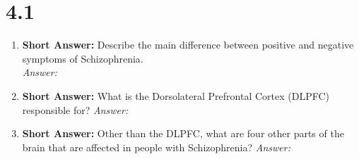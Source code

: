 \section*{4.1}
\begin{enumerate}[label=\textbf{Q4.1.\arabic*}]

    \item \textbf{Short Answer:} Describe the main difference between positive and negative symptoms of Schizophrenia. \\
          \textit{Answer:} \\ %

    \item \textbf{Short Answer:} What is the Dorsolateral Prefrontal Cortex (DLPFC) responsible for?
          \textit{Answer:} %

    \item \textbf{Short Answer:} Other than the DLPFC, what are four other parts of the brain that are affected in people with Schizophrenia?
          \textit{Answer:} %




\end{enumerate}
